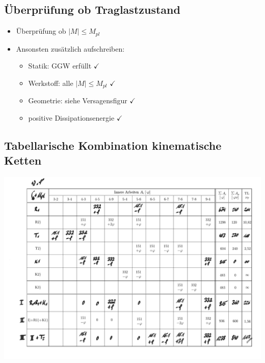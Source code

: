 \documentclass[fleqn,twoside]{article}
\newcommand{\abs}[1]{\ensuremath{\left\vert#1\right\vert}}
\begin{document}
    \subsection{Überprüfung ob Traglastzustand}
        \begin{itemize}
            \item Überprüfung ob $\abs{M} \leq M_{pl}$
            \item Ansonsten zusätzlich aufschreiben:
                \begin{itemize}
                    \item Statik: GGW erfüllt $\checkmark$
                    \item Werkstoff: alle $\abs{M} \leq M_{pl}$ $\checkmark$
                    \item Geometrie: siehe Versagensfigur $\checkmark$
                    \item positive Dissipationsenergie $\checkmark$
                \end{itemize}
        \end{itemize}
    \subsection{Tabellarische Kombination kinematische Ketten}
        \includegraphics[scale = 0.55]{Grafiken/KombinationElementarketten.pdf}
\end{document}
